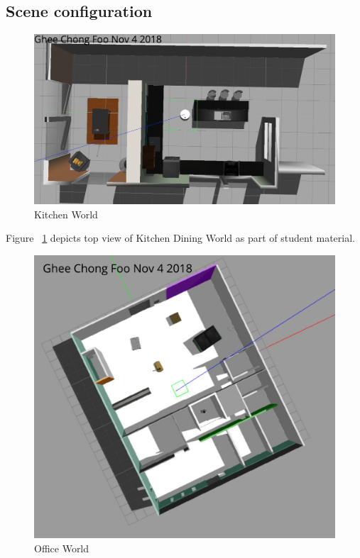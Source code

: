 \documentclass[10pt,journal,compsoc]{IEEEtran}
\begin{document}
\subsection{Scene configuration}
\begin{figure}[thpb]
      \centering
      \includegraphics[width=\linewidth]{kitchen_world_top_view.png}
      \caption{Kitchen World}
      \label{fig:kitchen_top}
\end{figure}

Figure ~\ref{fig:kitchen_top} depicts top view of Kitchen Dining World as part of student material.

\begin{figure}[thpb]
      \centering
      \includegraphics[width=\linewidth]{Office_World.png}
      \caption{Office World}
      \label{fig:office_top}
\end{figure}
\end{document}
